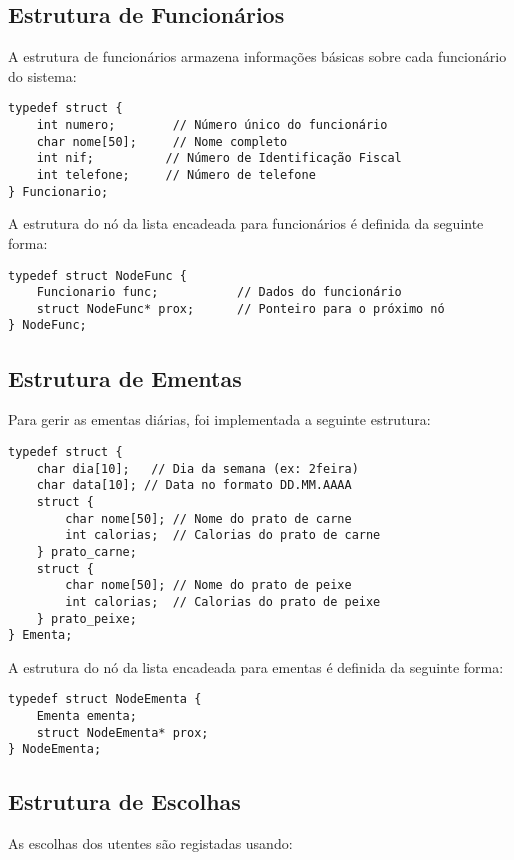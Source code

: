\documentclass[a4paper,12pt]{report}
\begin{document}
\subsection{Estrutura de Funcionários}
A estrutura de funcionários armazena informações básicas sobre cada funcionário do sistema:

\begin{lstlisting}[caption={Estrutura de dados para Funcionários},label=lst:funcionario]
typedef struct {
    int numero;        // Número único do funcionário
    char nome[50];     // Nome completo
    int nif;          // Número de Identificação Fiscal
    int telefone;     // Número de telefone
} Funcionario;
\end{lstlisting}
\noindent
A estrutura do nó da lista encadeada para funcionários é definida da seguinte forma:
\begin{lstlisting}[caption={Estrutura do Nó da Lista de Funcionários},label=lst:noFuncionario]
typedef struct NodeFunc {
    Funcionario func;           // Dados do funcionário
    struct NodeFunc* prox;      // Ponteiro para o próximo nó
} NodeFunc;
\end{lstlisting}

\subsection{Estrutura de Ementas}
Para gerir as ementas diárias, foi implementada a seguinte estrutura:

\begin{lstlisting}[caption={Estrutura de dados para Ementas},label=lst:ementa]
typedef struct {
    char dia[10];   // Dia da semana (ex: 2feira)
    char data[10]; // Data no formato DD.MM.AAAA
    struct {
        char nome[50]; // Nome do prato de carne
        int calorias;  // Calorias do prato de carne
    } prato_carne;
    struct {
        char nome[50]; // Nome do prato de peixe
        int calorias;  // Calorias do prato de peixe
    } prato_peixe;
} Ementa;
\end{lstlisting}
\noindent
A estrutura do nó da lista encadeada para ementas é definida da seguinte forma:
\begin{lstlisting}[caption={Estrutura do Nó da Lista de Ementas},label=lst:noEmenta]
typedef struct NodeEmenta {
    Ementa ementa;
    struct NodeEmenta* prox;
} NodeEmenta;
\end{lstlisting}

\subsection{Estrutura de Escolhas}
As escolhas dos utentes são registadas usando:
\end{document}
